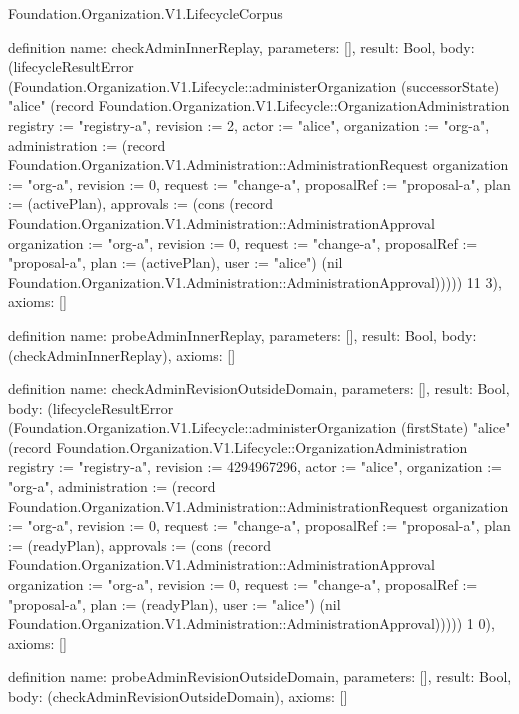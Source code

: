 \begin{lexlean}{Foundation.Organization.V1.LifecycleCorpus}
\begin{semanticmodule}
definition{
  name: checkAdminInnerReplay,
  parameters: [],
  result: Bool,
  body: (lifecycleResultError (Foundation.Organization.V1.Lifecycle::administerOrganization (successorState) "alice" (record Foundation.Organization.V1.Lifecycle::OrganizationAdministration {registry := "registry-a", revision := 2, actor := "alice", organization := "org-a", administration := (record Foundation.Organization.V1.Administration::AdministrationRequest {organization := "org-a", revision := 0, request := "change-a", proposalRef := "proposal-a", plan := (activePlan), approvals := (cons (record Foundation.Organization.V1.Administration::AdministrationApproval {organization := "org-a", revision := 0, request := "change-a", proposalRef := "proposal-a", plan := (activePlan), user := "alice"}) (nil Foundation.Organization.V1.Administration::AdministrationApproval))})})) 11 3),
  axioms: []
}

definition{
  name: probeAdminInnerReplay,
  parameters: [],
  result: Bool,
  body: (checkAdminInnerReplay),
  axioms: []
}

definition{
  name: checkAdminRevisionOutsideDomain,
  parameters: [],
  result: Bool,
  body: (lifecycleResultError (Foundation.Organization.V1.Lifecycle::administerOrganization (firstState) "alice" (record Foundation.Organization.V1.Lifecycle::OrganizationAdministration {registry := "registry-a", revision := 4294967296, actor := "alice", organization := "org-a", administration := (record Foundation.Organization.V1.Administration::AdministrationRequest {organization := "org-a", revision := 0, request := "change-a", proposalRef := "proposal-a", plan := (readyPlan), approvals := (cons (record Foundation.Organization.V1.Administration::AdministrationApproval {organization := "org-a", revision := 0, request := "change-a", proposalRef := "proposal-a", plan := (readyPlan), user := "alice"}) (nil Foundation.Organization.V1.Administration::AdministrationApproval))})})) 1 0),
  axioms: []
}

definition{
  name: probeAdminRevisionOutsideDomain,
  parameters: [],
  result: Bool,
  body: (checkAdminRevisionOutsideDomain),
  axioms: []
}


\end{semanticmodule}
\end{lexlean}
